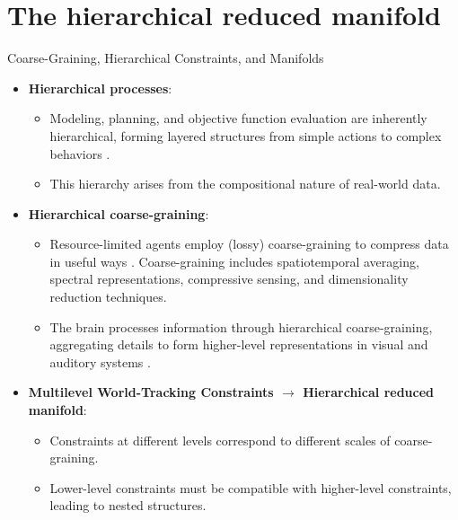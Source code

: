 

\section{The hierarchical reduced manifold}
\begin{frame}{Coarse-Graining, Hierarchical Constraints, and Manifolds\cite{ruffiniStructuredDynamicsAlgorithmic2023}}
    \begin{itemize}
        \item \textbf{Hierarchical processes}:
        \begin{itemize}
            \item Modeling, planning, and objective function evaluation are inherently hierarchical, forming layered structures from simple actions to complex behaviors \cite{ruffiniAITFoundationsStructured2022}.
            \item This hierarchy arises from the compositional nature of real-world data.
        \end{itemize}
        \item \textbf{Hierarchical coarse-graining}:
        \begin{itemize}
            \item Resource-limited agents employ (lossy) coarse-graining to compress data in useful  ways \cite{ruffiniNavigatingComplexityHow2024}.
            Coarse-graining includes spatiotemporal averaging, spectral representations, compressive sensing, and dimensionality reduction techniques.
            \item The brain processes information through hierarchical coarse-graining, aggregating details to form higher-level representations in visual and auditory systems \cite{dicarloHowDoesBrain2012,grill-spectorFunctionalArchitectureVentral2014,bizleyWhatWhereHow2013}.
        \end{itemize}
        \item \textbf{Multilevel World-Tracking Constraints $\longrightarrow$ Hierarchical reduced manifold}:
        \begin{itemize}
            \item Constraints at different levels correspond to different scales of coarse-graining.
            \item Lower-level constraints must be compatible with higher-level constraints, leading to nested structures.
        \end{itemize}
    \end{itemize}

\end{frame}

